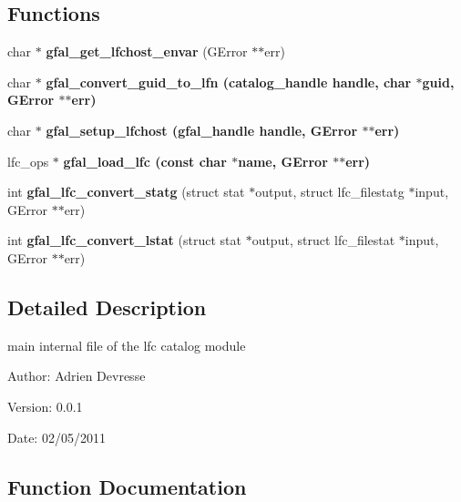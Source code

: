 \subsection*{Functions}
\begin{CompactItemize}
\item 
char $\ast$ \textbf{gfal\_\-get\_\-lfchost\_\-envar} (GError $\ast$$\ast$err)\label{lfc__ifce__ng_8c_9a5b8e8e30853b920e3bbe41062e1d25}

\item 
char $\ast$ \bf{gfal\_\-convert\_\-guid\_\-to\_\-lfn} (catalog\_\-handle handle, char $\ast$guid, GError $\ast$$\ast$err)
\item 
char $\ast$ \bf{gfal\_\-setup\_\-lfchost} (gfal\_\-handle handle, GError $\ast$$\ast$err)
\item 
lfc\_\-ops $\ast$ \bf{gfal\_\-load\_\-lfc} (const char $\ast$name, GError $\ast$$\ast$err)
\item 
int \textbf{gfal\_\-lfc\_\-convert\_\-statg} (struct stat $\ast$output, struct lfc\_\-filestatg $\ast$input, GError $\ast$$\ast$err)\label{lfc__ifce__ng_8c_79cceda78f871c9bd8568a636dd31206}

\item 
int \textbf{gfal\_\-lfc\_\-convert\_\-lstat} (struct stat $\ast$output, struct lfc\_\-filestat $\ast$input, GError $\ast$$\ast$err)\label{lfc__ifce__ng_8c_16e8d4c4177c6e1d39c1850f06042f97}

\end{CompactItemize}


\subsection{Detailed Description}
main internal file of the lfc catalog module 

\begin{Desc}
\item[Author:]Adrien Devresse \end{Desc}
\begin{Desc}
\item[Version:]0.0.1 \end{Desc}
\begin{Desc}
\item[Date:]02/05/2011 \end{Desc}


\subsection{Function Documentation}
